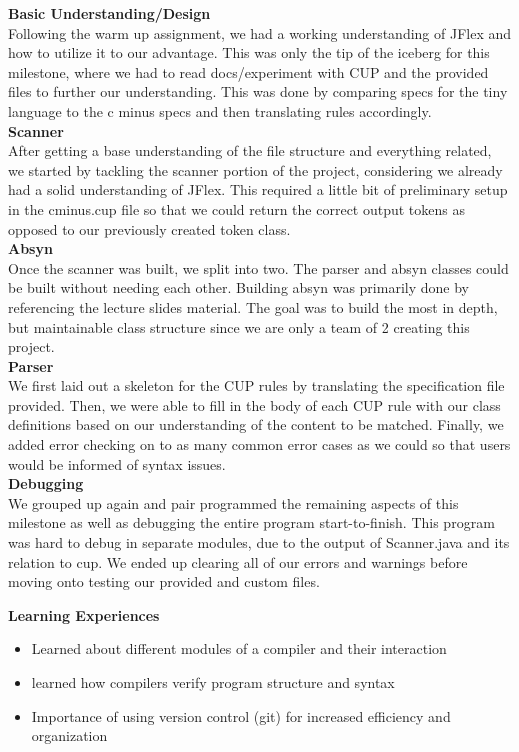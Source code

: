 \documentclass[12pt]{extarticle}
\begin{document}
\textbf{Basic Understanding/Design} \\
Following the warm up assignment, we had a working understanding of JFlex and how to utilize it to our advantage. This was only the tip of the iceberg for this milestone, where we had to read docs/experiment with CUP and the provided files to further our understanding. This was done by comparing specs for the tiny language to the c minus specs and then translating rules accordingly. \\
\textbf{Scanner} \\
After getting a base understanding of the file structure and everything related, we started by tackling the scanner portion of the project, considering we already had a solid understanding of JFlex. This required a little bit of preliminary setup in the cminus.cup file so that we could return the correct output tokens as opposed to our previously created token class. \\
\textbf{Absyn} \\
Once the scanner was built, we split into two. The parser and absyn classes could be built without needing each other. Building absyn was primarily done by referencing the lecture slides material. The goal was to build the most in depth, but maintainable class structure since we are only a team of 2 creating this project. \\
\textbf{Parser} \\
We first laid out a skeleton for the CUP rules by translating the specification file provided. Then, we were able to fill in the body of each CUP rule with our class definitions based on our understanding of the content to be matched. Finally, we added error checking on to as many common error cases as we could so that users would be informed of syntax issues.\\
\textbf{Debugging} \\
We grouped up again and pair programmed the remaining aspects of this milestone as well as debugging the entire program start-to-finish. This program was hard to debug in separate modules, due to the output of Scanner.java and its relation to cup. We ended up clearing all of our errors and warnings before moving onto testing our provided and custom files.

\textbf{Learning Experiences}
\begin{itemize}
    \item Learned about different modules of a compiler and their interaction
    \item learned how compilers verify program structure and syntax
    \item Importance of using version control (git) for increased efficiency and organization
\end{itemize}
\end{document}
